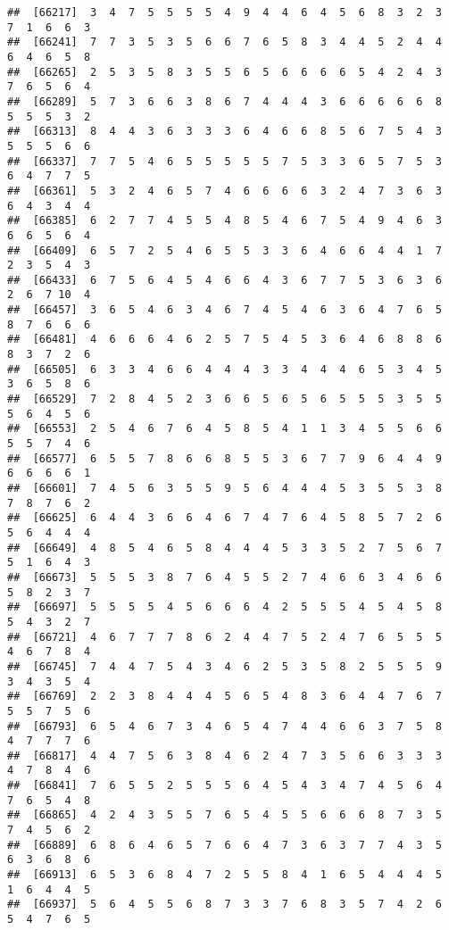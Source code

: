 \documentclass[
]{book}
\begin{document}
\begin{verbatim}
##  [66217]  3  4  7  5  5  5  5  4  9  4  4  6  4  5  6  8  3  2  3  7  1  6  6  3
##  [66241]  7  7  3  5  3  5  6  6  7  6  5  8  3  4  4  5  2  4  4  6  4  6  5  8
##  [66265]  2  5  3  5  8  3  5  5  6  5  6  6  6  6  5  4  2  4  3  7  6  5  6  4
##  [66289]  5  7  3  6  6  3  8  6  7  4  4  4  3  6  6  6  6  6  8  5  5  5  3  2
##  [66313]  8  4  4  3  6  3  3  3  6  4  6  6  8  5  6  7  5  4  3  5  5  5  6  6
##  [66337]  7  7  5  4  6  5  5  5  5  5  7  5  3  3  6  5  7  5  3  6  4  7  7  5
##  [66361]  5  3  2  4  6  5  7  4  6  6  6  6  3  2  4  7  3  6  3  6  4  3  4  4
##  [66385]  6  2  7  7  4  5  5  4  8  5  4  6  7  5  4  9  4  6  3  6  6  5  6  4
##  [66409]  6  5  7  2  5  4  6  5  5  3  3  6  4  6  6  4  4  1  7  2  3  5  4  3
##  [66433]  6  7  5  6  4  5  4  6  6  4  3  6  7  7  5  3  6  3  6  2  6  7 10  4
##  [66457]  3  6  5  4  6  3  4  6  7  4  5  4  6  3  6  4  7  6  5  8  7  6  6  6
##  [66481]  4  6  6  6  4  6  2  5  7  5  4  5  3  6  4  6  8  8  6  8  3  7  2  6
##  [66505]  6  3  3  4  6  6  4  4  4  3  3  4  4  4  6  5  3  4  5  3  6  5  8  6
##  [66529]  7  2  8  4  5  2  3  6  6  5  6  5  6  5  5  5  3  5  5  5  6  4  5  6
##  [66553]  2  5  4  6  7  6  4  5  8  5  4  1  1  3  4  5  5  6  6  5  5  7  4  6
##  [66577]  6  5  5  7  8  6  6  8  5  5  3  6  7  7  9  6  4  4  9  6  6  6  6  1
##  [66601]  7  4  5  6  3  5  5  9  5  6  4  4  4  5  3  5  5  3  8  7  8  7  6  2
##  [66625]  6  4  4  3  6  6  4  6  7  4  7  6  4  5  8  5  7  2  6  5  6  4  4  4
##  [66649]  4  8  5  4  6  5  8  4  4  4  5  3  3  5  2  7  5  6  7  5  1  6  4  3
##  [66673]  5  5  5  3  8  7  6  4  5  5  2  7  4  6  6  3  4  6  6  5  8  2  3  7
##  [66697]  5  5  5  5  4  5  6  6  6  4  2  5  5  5  4  5  4  5  8  5  4  3  2  7
##  [66721]  4  6  7  7  7  8  6  2  4  4  7  5  2  4  7  6  5  5  5  4  6  7  8  4
##  [66745]  7  4  4  7  5  4  3  4  6  2  5  3  5  8  2  5  5  5  9  3  4  3  5  4
##  [66769]  2  2  3  8  4  4  4  5  6  5  4  8  3  6  4  4  7  6  7  5  5  7  5  6
##  [66793]  6  5  4  6  7  3  4  6  5  4  7  4  4  6  6  3  7  5  8  4  7  7  7  6
##  [66817]  4  4  7  5  6  3  8  4  6  2  4  7  3  5  6  6  3  3  3  4  7  8  4  6
##  [66841]  7  6  5  5  2  5  5  5  6  4  5  4  3  4  7  4  5  6  4  7  6  5  4  8
##  [66865]  4  2  4  3  5  5  7  6  5  4  5  5  6  6  6  8  7  3  5  7  4  5  6  2
##  [66889]  6  8  6  4  6  5  7  6  6  4  7  3  6  3  7  7  4  3  5  6  3  6  8  6
##  [66913]  6  5  3  6  8  4  7  2  5  5  8  4  1  6  5  4  4  4  5  1  6  4  4  5
##  [66937]  5  6  4  5  5  6  8  7  3  3  7  6  8  3  5  7  4  2  6  5  4  7  6  5

\end{verbatim}
\end{document}
